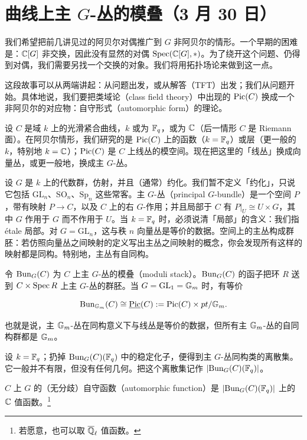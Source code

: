 \section[曲线上主 $G$-丛的模叠]{曲线上主 $G$-丛的模叠（3 月 30 日）}


我们希望把前几讲见过的阿贝尔对偶推广到 $G$ 非阿贝尔的情形。一个早期的困难是：$\mathbb{C}[G]$ 非交换，因此没有显然的对偶 $\operatorname{Spec}(\mathbb{C}[G],*)$。为了绕开这个问题、仍得到对偶，我们需要另找一个交换的对象。我们将用拓扑场论来做到这一点。

这段故事可以从两端讲起：从问题出发，或从解答（TFT）出发；我们从问题开始。具体地说，我们要把类域论（class field theory）中出现的 $\operatorname{Pic}(C)$ 换成一个非阿贝尔的对应物：自守形式（automorphic form）的理论。

设 $C$ 是域 $k$ 上的光滑紧合曲线，$k$ 或为 $\mathbb{F}_q$，或为 $\mathbb{C}$（后一情形 $C$ 是 Riemann 面）。在阿贝尔情形，我们研究的是 $\operatorname{Pic}(C)$ 上的函数（$k=\mathbb{F}_q$）或层（更一般的 $k$，特别地 $k=\mathbb{C}$）；$\operatorname{Pic}(C)$ 是 $C$ 上线丛的模空间。现在把这里的「线丛」换成向量丛，或更一般地，换成主 $G$-丛。

设 $G$ 是 $k$ 上的代数群，仿射，并且（通常）约化。我们暂不定义「约化」，只说它包括 $\mathrm{GL}_n$、$\mathrm{SO}_n$、$\mathrm{Sp}_n$ 这些常客。主 $G$-丛（principal $G$-bundle）是一个空间 $P$，带有映射 $P\to C$，以及 $C$ 上的右 $G$-作用；并且局部于 $C$ 有 $P|_U\cong U\times G$，其中 $G$ 作用于 $G$ 而不作用于 $U$。当 $k=\mathbb{F}_q$ 时，必须说清「局部」的含义：我们指 étale 局部。对 $G=\mathrm{GL}_n$，这与秩 $n$ 向量丛是等价的数据。空间上的主丛构成群胚：若仿照向量丛之间映射的定义写出主丛之间映射的概念，你会发现所有这样的映射都是同构。特别地，主丛有自同构。

令 $\mathrm{Bun}_G(C)$ 为 $C$ 上主 $G$-丛的模叠（moduli stack）。$\mathrm{Bun}_G(C)$ 的函子把环 $R$ 送到 $C\times\operatorname{Spec} R$ 上主 $G$-丛的群胚。当 $G=\mathrm{GL}_1=\mathbb{G}_m$ 时，有等价


\[\mathrm{Bun}_{\mathbb{G}_m}(C)\cong \underline{\operatorname{Pic}}(C):=\operatorname{Pic}(C)\times pt/\mathbb{G}_m.\]

也就是说，主 $\mathbb{G}_m$-丛在同构意义下与线丛是等价的数据，但所有主 $\mathbb{G}_m$-丛的自同构群都是 $\mathbb{G}_m$。

设 $k=\mathbb{F}_q$；扔掉 $\mathrm{Bun}_G(C)(\mathbb{F}_q)$ 中的稳定化子，便得到主 $G$-丛同构类的离散集。它一般并不有限，但没有任何几何。把这个离散集记作 $|\mathrm{Bun}_G(C)(\mathbb{F}_q)|$。

\begin{definition}
$C$ 上 $G$ 的（无分歧）自守函数（automorphic function）是 $|\mathrm{Bun}_G(C)(\mathbb{F}_q)|$ 上的 $\mathbb{C}$ 值函数。\footnote{若愿意，也可以取 $\overline{\mathbb{Q}}_\ell$ 值函数。}
\end{definition}

